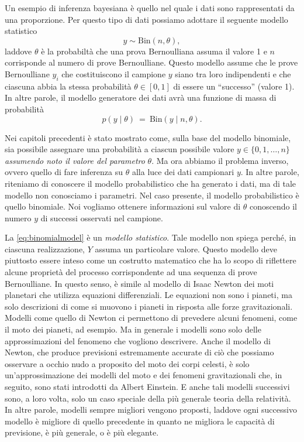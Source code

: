 \documentclass[
  11pt,
  italian,
  a4paper,
  extrafontsizes,onecolumn,openright
  ]{memoir}
\begin{document}
Un esempio di inferenza bayesiana è quello nel quale i dati sono rappresentati da una proporzione. Per questo tipo di dati possiamo adottare il seguente modello statistico
\begin{equation}
y  \sim \mbox{Bin}(n, \theta),
\label{eq:binomialmodel}
\end{equation}
laddove \(\theta\) è la probabiltà che una prova Bernoulliana assuma il valore 1 e \(n\) corrisponde al numero di prove Bernoulliane. Questo modello assume che le prove Bernoulliane \(y_i\) che costituiscono il campione \(y\) siano tra loro indipendenti e che ciascuna abbia la stessa probabilità \(\theta \in [0, 1]\) di essere un ``successo'' (valore 1). In altre parole, il modello generatore dei dati avrà una funzione di massa di probabilità
\[
p(y \mid \theta)
\ = \
\mbox{Bin}(y \mid n, \theta).
\]

Nei capitoli precedenti è stato mostrato come, sulla base del modello binomiale, sia possibile assegnare una probabilità a ciascun possibile valore \(y \in \{0, 1, \dots, n\}\) \emph{assumendo noto il valore del parametro} \(\theta\). Ma ora abbiamo il problema inverso, ovvero quello di fare inferenza su \(\theta\) alla luce dei dati campionari \(y\). In altre parole, riteniamo di conoscere il modello probabilistico che ha generato i dati, ma di tale modello non conosciamo i parametri. Nel caso presente, il modello probabilistico è quello binomiale. Noi vogliamo ottenere informazioni sul valore di \(\theta\) conoscendo il numero \(y\) di successi osservati nel campione.

La \eqref{eq:binomialmodel} è un \emph{modello statistico}. Tale modello non spiega perché, in ciascuna realizzazione, \(Y\) assuma un particolare valore. Questo modello deve piuttosto essere inteso come un costrutto matematico che ha lo scopo di riflettere alcune proprietà del processo corrispondente ad una sequenza di prove Bernoulliane. In questo senso, è simile al modello di Isaac Newton dei moti planetari che utilizza equazioni differenziali. Le equazioni non sono i pianeti, ma solo descrizioni di come si muovono i pianeti in risposta alle forze gravitazionali. Modelli come quello di Newton ci permettono di prevedere alcuni fenomeni, come il moto dei pianeti, ad esempio. Ma in generale i modelli sono solo delle approssimazioni del fenomeno che vogliono descrivere. Anche il modello di Newton, che produce previsioni estremamente accurate di ciò che possiamo osservare a occhio nudo a proposito del moto dei corpi celesti, è solo un'approssimazione dei modelli del moto e dei fenomeni gravitazionali che, in seguito, sono stati introdotti da Albert Einstein. E anche tali modelli successivi sono, a loro volta, solo un caso speciale della più generale teoria della relatività. In altre parole, modelli sempre migliori vengono proposti, laddove ogni successivo modello è migliore di quello precedente in quanto ne migliora le capacità di previsione, è più generale, o è più elegante.
\end{document}
